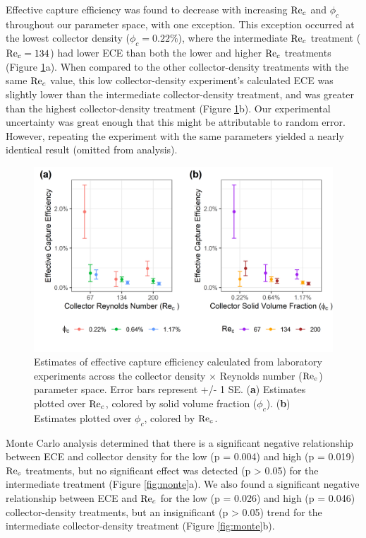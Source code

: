 \documentclass[geosciences,article,submit,moreauthors,pdftex]{Definitions/mdpi}
\begin{document}
Effective capture efficiency was found to decrease with increasing $\mathrm{Re}_c$ and $\phi_c$ throughout our parameter space, with one exception. This exception occurred at the lowest collector density ($\phi_c = 0.22\%$), where the intermediate $\mathrm{Re}_c$ treatment ($\mathrm{Re}_c = 134$) had lower ECE than both the lower and higher $\mathrm{Re}_c$ treatments (Figure \ref{fig:ece}a). When compared to the other collector-density treatments with the same $\mathrm{Re}_c$ value, this low collector-density experiment's calculated ECE was slightly lower than the intermediate collector-density treatment, and was greater than the highest collector-density treatment (Figure \ref{fig:ece}b). Our experimental uncertainty was great enough that this might be attributable to random error. However, repeating the experiment with the same parameters yielded a nearly identical result (omitted from analysis).

\begin{figure}[htb]
\centering
\includegraphics[width=5in]{../pics/ece_plot.png}
\caption{Estimates of effective capture efficiency calculated from laboratory experiments across the collector density $\times$ Reynolds number ($\mathrm{Re}_c$) parameter space. Error bars represent +/- 1 SE. (\textbf{a}) Estimates plotted over $\mathrm{Re}_c$, colored by solid volume fraction ($\phi_c$). (\textbf{b}) Estimates plotted over $\phi_c$, colored by $\mathrm{Re}_c$.}
\label{fig:ece}
\end{figure}   

Monte Carlo analysis determined that there is a significant negative relationship between ECE and collector density for the low (p = 0.004) and high (p = 0.019) $\mathrm{Re}_c$ treatments, but no significant effect was detected (p > 0.05) for the intermediate treatment (Figure \ref{fig:monte}a). We also found a significant negative relationship between ECE and $\mathrm{Re}_c$ for the low (p = 0.026) and high (p = 0.046) collector-density treatments, but an insignificant (p > 0.05) trend for the intermediate collector-density treatment (Figure \ref{fig:monte}b). 
\end{document}
